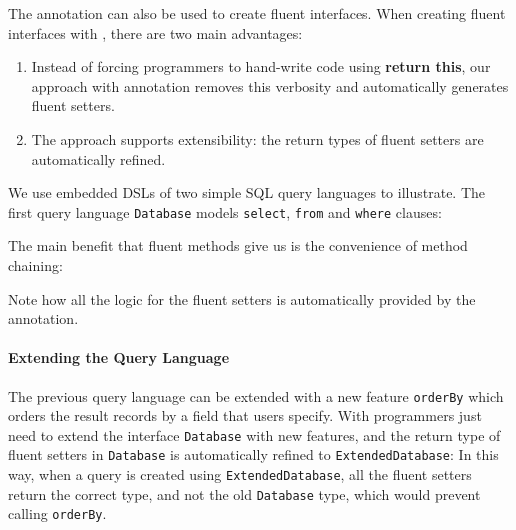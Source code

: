 The \mixin annotation can also be used to create fluent interfaces.  When
creating fluent interfaces with \mixin, there are two main advantages:
\begin{enumerate}
\item Instead of forcing programmers to hand-write code using \textbf{return
    this}, our approach with \mixin annotation removes this verbosity and
  automatically generates fluent setters.
\item The approach supports extensibility: the return types of fluent setters are
  automatically refined.
\end{enumerate}

\noindent We use embedded DSLs of two simple SQL query languages to illustrate.
The first query language \texttt{Database}  models
\texttt{select}, \texttt{from} and \texttt{where} clauses:

\noindent The main benefit that fluent methods give
us is the convenience of method chaining:


\noindent Note how all the logic for the fluent setters is automatically provided by the \mixin annotation.

\paragraph{Extending the Query Language} The previous query language can be extended with a new feature
\texttt{orderBy} which orders the result records by a field that users
specify. With \mixin programmers just need to extend the interface \texttt{Database} with new
features, and the return type of fluent setters in
\texttt{Database} is automatically refined to \texttt{ExtendedDatabase}:
In this way, when a query is created using \texttt{ExtendedDatabase},
all the fluent setters return the correct type, and not the old \texttt{Database} type, which would prevent calling
\texttt{orderBy}.

